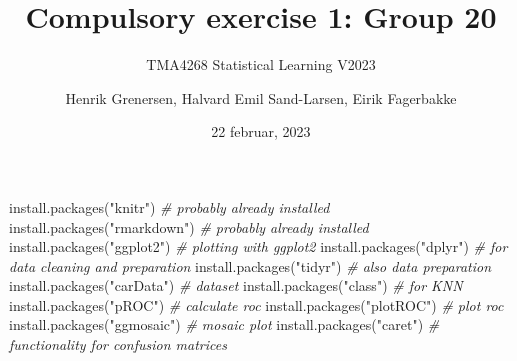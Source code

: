 \documentclass[
]{article}
\title{Compulsory exercise 1: Group 20}
\subtitle{TMA4268 Statistical Learning V2023}
\author{Henrik Grenersen, Halvard Emil Sand-Larsen, Eirik Fagerbakke}
\date{22 februar, 2023}
\newenvironment{Shaded}{\begin{snugshade}}{\end{snugshade}}
\newcommand{\AttributeTok}[1]{\textcolor[rgb]{0.77,0.63,0.00}{#1}}
\newcommand{\CommentTok}[1]{\textcolor[rgb]{0.56,0.35,0.01}{\textit{#1}}}
\newcommand{\ConstantTok}[1]{\textcolor[rgb]{0.00,0.00,0.00}{#1}}
\newcommand{\DecValTok}[1]{\textcolor[rgb]{0.00,0.00,0.81}{#1}}
\newcommand{\FunctionTok}[1]{\textcolor[rgb]{0.00,0.00,0.00}{#1}}
\newcommand{\NormalTok}[1]{#1}
\newcommand{\SpecialCharTok}[1]{\textcolor[rgb]{0.00,0.00,0.00}{#1}}
\newcommand{\StringTok}[1]{\textcolor[rgb]{0.31,0.60,0.02}{#1}}
\begin{document}
\maketitle

\begin{Shaded}
\end{Shaded}

\begin{Shaded}
\begin{Highlighting}[]
\FunctionTok{install.packages}\NormalTok{(}\StringTok{"knitr"}\NormalTok{)  }\CommentTok{\# probably already installed}
\FunctionTok{install.packages}\NormalTok{(}\StringTok{"rmarkdown"}\NormalTok{)  }\CommentTok{\# probably already installed}
\FunctionTok{install.packages}\NormalTok{(}\StringTok{"ggplot2"}\NormalTok{)  }\CommentTok{\# plotting with ggplot2}
\FunctionTok{install.packages}\NormalTok{(}\StringTok{"dplyr"}\NormalTok{)  }\CommentTok{\# for data cleaning and preparation}
\FunctionTok{install.packages}\NormalTok{(}\StringTok{"tidyr"}\NormalTok{)  }\CommentTok{\# also data preparation}
\FunctionTok{install.packages}\NormalTok{(}\StringTok{"carData"}\NormalTok{)  }\CommentTok{\# dataset}
\FunctionTok{install.packages}\NormalTok{(}\StringTok{"class"}\NormalTok{)  }\CommentTok{\# for KNN}
\FunctionTok{install.packages}\NormalTok{(}\StringTok{"pROC"}\NormalTok{)  }\CommentTok{\# calculate roc}
\FunctionTok{install.packages}\NormalTok{(}\StringTok{"plotROC"}\NormalTok{)  }\CommentTok{\# plot roc}
\FunctionTok{install.packages}\NormalTok{(}\StringTok{"ggmosaic"}\NormalTok{)  }\CommentTok{\# mosaic plot}
\FunctionTok{install.packages}\NormalTok{(}\StringTok{"caret"}\NormalTok{)  }\CommentTok{\# functionality for confusion matrices}
\end{Highlighting}
\end{Shaded}
\end{document}
